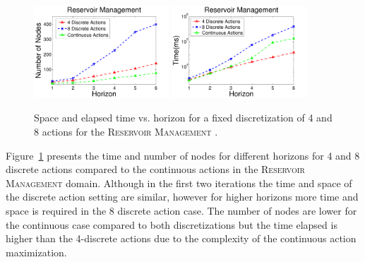 \documentclass[twoside,11pt]{article}
\newcommand{\WaterReservoir}{\textsc{Reservoir Management }}
\begin{document}
\begin{figure}[tbp!]
\vspace{2mm}
\centering
\includegraphics[width=0.45\textwidth]{pics/DisResNode2.pdf}
\hspace{2mm}
\includegraphics[width=0.45\textwidth]{pics/DisResTime2.pdf}
\vspace{-2mm}
\caption{%
Space and elapsed time vs. horizon for a fixed discretization of 4 and 8 actions for the \WaterReservoir.}
\label{fig:resDisTS}
\vspace{-5mm}
\end{figure}

Figure~\ref{fig:resDisTS} presents the time and number of nodes for different horizons for 4 and 8 discrete actions compared to the continuous actions in the \WaterReservoir domain. Although in the first two iterations the time and space of the discrete action setting are similar, however for higher horizons more time and space is required in the 8 discrete action case. The number of nodes are lower for the continuous case compared to both discretizations but the time elapsed is higher than the 4-discrete actions due to the complexity of the continuous action maximization.
\end{document}
